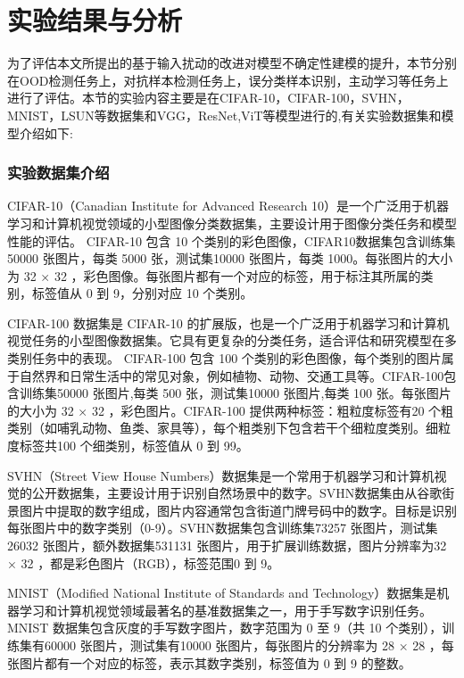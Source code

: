 \section{实验结果与分析}
为了评估本文所提出的基于输入扰动的改进对模型不确定性建模的提升，本节分别在OOD检测任务上，对抗样本检测任务上，误分类样本识别，主动学习等任务上进行了评估。本节的实验内容主要是在CIFAR-10\cite{Krizhevsky2009}，CIFAR-100\cite{Krizhevsky2009}，SVHN\cite{Netzer2011}，MNIST\cite{LeCun1998}，LSUN\cite{Yu2015}等数据集和VGG\cite{simonyan2014very}，ResNet\cite{he2016deep},ViT\cite{dosovitskiy2020image}等模型进行的,有关实验数据集和模型介绍如下:

\subsubsection{实验数据集介绍}


CIFAR-10（Canadian Institute for Advanced Research 10）是一个广泛用于机器学习和计算机视觉领域的小型图像分类数据集，主要设计用于图像分类任务和模型性能的评估。 CIFAR-10 包含 10 个类别的彩色图像，CIFAR10数据集包含训练集50000 张图片，每类 5000 张，测试集10000 张图片，每类 1000。每张图片的大小为 32 × 32 ，彩色图像。每张图片都有一个对应的标签，用于标注其所属的类别，标签值从 0 到 9，分别对应 10 个类别。

CIFAR-100 数据集是 CIFAR-10 的扩展版，也是一个广泛用于机器学习和计算机视觉任务的小型图像数据集。它具有更复杂的分类任务，适合评估和研究模型在多类别任务中的表现。 CIFAR-100 包含 100 个类别的彩色图像，每个类别的图片属于自然界和日常生活中的常见对象，例如植物、动物、交通工具等。CIFAR-100包含训练集50000 张图片,每类 500 张，测试集10000 张图片,每类 100 张。每张图片的大小为 32 × 32 ，彩色图片。CIFAR-100 提供两种标签：粗粒度标签有20 个粗类别（如哺乳动物、鱼类、家具等），每个粗类别下包含若干个细粒度类别。细粒度标签共100 个细类别，标签值从 0 到 99。

SVHN（Street View House Numbers）数据集是一个常用于机器学习和计算机视觉的公开数据集，主要设计用于识别自然场景中的数字。SVHN数据集由从谷歌街景图片中提取的数字组成，图片内容通常包含街道门牌号码中的数字。目标是识别每张图片中的数字类别（0-9）。SVHN数据集包含训练集73257 张图片，测试集26032 张图片，额外数据集531131 张图片，用于扩展训练数据，图片分辨率为32 × 32 ，都是彩色图片（RGB），标签范围0 到 9。

MNIST（Modified National Institute of Standards and Technology）数据集是机器学习和计算机视觉领域最著名的基准数据集之一，用于手写数字识别任务。 MNIST 数据集包含灰度的手写数字图片，数字范围为 0 至 9（共 10 个类别），训练集有60000 张图片，测试集有10000 张图片，每张图片的分辨率为 28 × 28 ，每张图片都有一个对应的标签，表示其数字类别，标签值为 0 到 9 的整数。



